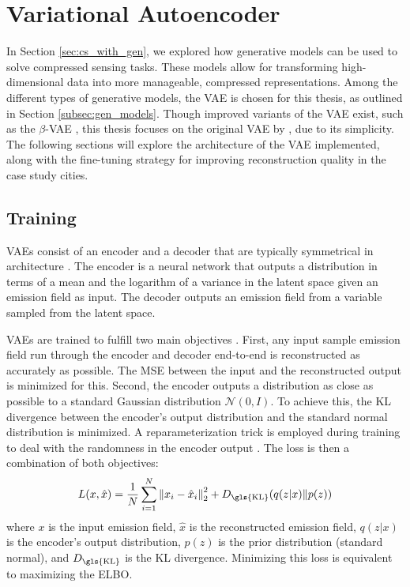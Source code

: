 
\chapter{Variational Autoencoder}\label{chapter:vae}

In Section \ref{sec:cs_with_gen}, we explored how generative models can be used to solve compressed sensing tasks.
These models allow for transforming high-dimensional data into more manageable, compressed representations.
Among the different types of generative models, the \gls{VAE} \parencite{VAE} is chosen for this thesis, as outlined in Section \ref{subsec:gen_models}.
Though improved variants of the \gls{VAE} exist, such as the $\beta$-\gls{VAE} \parencite{Beta-VAE},  this thesis focuses on the original \gls{VAE} by \textcite{VAE}, due to its simplicity.
The following sections will explore the architecture of the \gls{VAE} implemented, along with the fine-tuning strategy for improving reconstruction quality in the case study cities.

\section{Training}
\gls{VAE}s consist of an encoder and a decoder that are typically symmetrical in architecture \parencite{VAE}.
The encoder is a neural network that outputs a distribution in terms of a mean and the logarithm of a variance in the latent space given an emission field as input. The decoder outputs an emission field from a variable sampled from the latent space.

\gls{VAE}s are trained to fulfill two main objectives \parencite{VAE}.
First, any input sample emission field run through the encoder and decoder end-to-end is reconstructed as accurately as possible.
The \gls{MSE} between the input and the reconstructed output is minimized for this.
Second, the encoder outputs a distribution as close as possible to a standard Gaussian distribution $\mathcal{N}(0, I)$.
To achieve this, the \gls{KL} divergence between the encoder's output distribution and the standard normal distribution is minimized.
A reparameterization trick is employed during training to deal with the randomness in the encoder output \parencite{VAE}.
The loss is then a combination of both objectives:
\begin{equation}
    L(x, \hat{x}) = \frac{1}{N}\sum_{i=1}^N \norm{x_i - \hat{x}_i}_2^2 + D_{\text{\gls{KL}}}(q(z|x) \rVert p(z))
\end{equation}
where $x$ is the input emission field, $\hat{x}$ is the reconstructed emission field, $q(z|x)$ is the encoder's output distribution, $p(z)$ is the prior distribution (standard normal), and $D_{\text{\gls{KL}}}$ is the \gls{KL} divergence.
Minimizing this loss is equivalent to maximizing the \gls{ELBO}.

